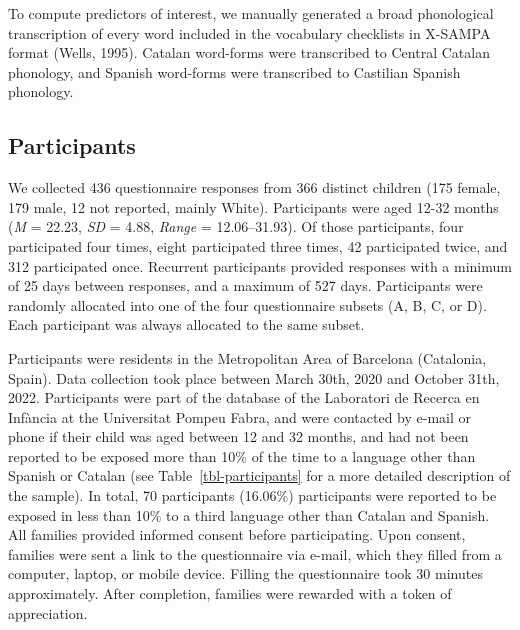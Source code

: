 \documentclass[
  12pt,
  b5paperpaper,
  twoside]{scrreprt}
\begin{document}
To compute predictors of interest, we manually generated a broad
phonological transcription of every word included in the vocabulary
checklists in X-SAMPA format (Wells, 1995). Catalan word-forms were
transcribed to Central Catalan phonology, and Spanish word-forms were
transcribed to Castilian Spanish phonology.

\hypertarget{sec-participants}{%
\subsection{Participants}\label{sec-participants}}

We collected 436 questionnaire responses from 366 distinct children (175
female, 179 male, 12 not reported, mainly White). Participants were aged
12-32 months (\emph{M} = 22.23, \emph{SD} = 4.88, \emph{Range} =
12.06--31.93). Of those participants, four participated four times,
eight participated three times, 42 participated twice, and 312
participated once. Recurrent participants provided responses with a
minimum of 25 days between responses, and a maximum of 527 days.
Participants were randomly allocated into one of the four questionnaire
subsets (A, B, C, or D). Each participant was always allocated to the
same subset.

Participants were residents in the Metropolitan Area of Barcelona
(Catalonia, Spain). Data collection took place between March 30th, 2020
and October 31th, 2022. Participants were part of the database of the
Laboratori de Recerca en Infància at the Universitat Pompeu Fabra, and
were contacted by e-mail or phone if their child was aged between 12 and
32 months, and had not been reported to be exposed more than 10\% of the
time to a language other than Spanish or Catalan (see
Table~\ref{tbl-participants} for a more detailed description of the
sample). In total, 70 participants (16.06\%) participants were reported
to be exposed in less than 10\% to a third language other than Catalan
and Spanish. All families provided informed consent before
participating. Upon consent, families were sent a link to the
questionnaire via e-mail, which they filled from a computer, laptop, or
mobile device. Filling the questionnaire took 30 minutes approximately.
After completion, families were rewarded with a token of appreciation.
\end{document}
